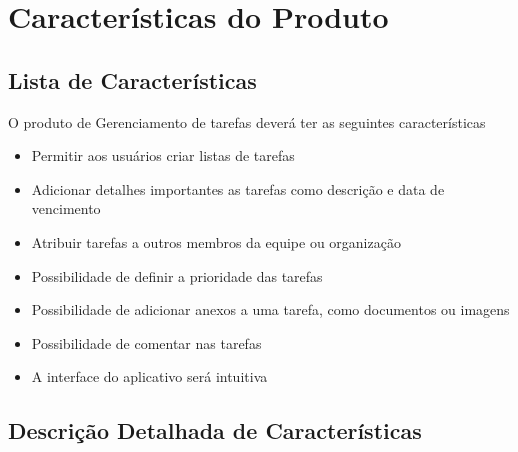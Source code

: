 \chapter{Características do Produto}

\section{Lista de Características}

O produto de Gerenciamento de tarefas deverá ter as seguintes características

\begin{itemize}
    \item Permitir aos usuários criar listas de tarefas
    \item Adicionar detalhes importantes as tarefas como descrição e data de vencimento
    \item Atribuir tarefas a outros membros da equipe ou organização
    \item Possibilidade de definir a prioridade das tarefas
    \item Possibilidade de adicionar anexos a uma tarefa, como documentos ou imagens
    \item Possibilidade de comentar nas tarefas
    \item A interface do aplicativo será intuitiva
\end{itemize}

\section{Descrição Detalhada de Características}

